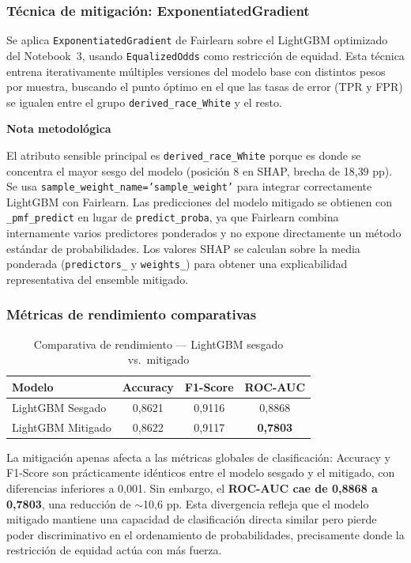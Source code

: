 \documentclass[11pt,a4paper]{article}
\newcommand{\discusiontitle}{%
  {\small\bfseries\color{blue!60!black}Nota metodológica}\par\smallskip
}
\begin{document}
\subsubsection{Técnica de mitigación: ExponentiatedGradient}

Se aplica \texttt{ExponentiatedGradient} de Fairlearn sobre el LightGBM optimizado del
Notebook~3, usando \texttt{EqualizedOdds} como restricción de equidad. Esta técnica entrena
iterativamente múltiples versiones del modelo base con distintos pesos por muestra, buscando
el punto óptimo en el que las tasas de error (TPR y FPR) se igualen entre el grupo
\texttt{derived\_race\_White} y el resto.

\begin{discusion}
\discusiontitle
El atributo sensible principal es \texttt{derived\_race\_White} porque es donde se concentra
el mayor sesgo del modelo (posición 8 en SHAP, brecha de 18{,}39 pp). Se usa
\texttt{sample\_weight\_name='sample\_weight'} para integrar correctamente LightGBM con
Fairlearn. Las predicciones del modelo mitigado se obtienen con \texttt{\_pmf\_predict} en lugar
de \texttt{predict\_proba}, ya que Fairlearn combina internamente varios predictores ponderados
y no expone directamente un método estándar de probabilidades. Los valores SHAP se calculan
sobre la media ponderada (\texttt{predictors\_} y \texttt{weights\_}) para obtener una
explicabilidad representativa del ensemble mitigado.
\end{discusion}

\subsubsection{Métricas de rendimiento comparativas}

\begin{table}[ht]
\centering
\caption{Comparativa de rendimiento --- LightGBM sesgado vs.\ mitigado}
\label{tab:rendimiento_mitigado}
\small
\begin{tabular}{@{}lccc@{}}
\toprule
\textbf{Modelo} & \textbf{Accuracy} & \textbf{F1-Score} & \textbf{ROC-AUC} \\ \midrule
LightGBM Sesgado  & 0{,}8621 & 0{,}9116 & 0{,}8868 \\
LightGBM Mitigado & 0{,}8622 & 0{,}9117 & \textbf{0{,}7803} \\
\bottomrule
\end{tabular}
\end{table}

La mitigación apenas afecta a las métricas globales de clasificación: Accuracy y F1-Score son
prácticamente idénticos entre el modelo sesgado y el mitigado, con diferencias inferiores a 0{,}001.
Sin embargo, el \textbf{ROC-AUC cae de 0{,}8868 a 0{,}7803}, una reducción de $\sim$10{,}6 pp.
Esta divergencia refleja que el modelo mitigado mantiene una capacidad de clasificación directa
similar pero pierde poder discriminativo en el ordenamiento de probabilidades, precisamente donde
la restricción de equidad actúa con más fuerza.
\end{document}
